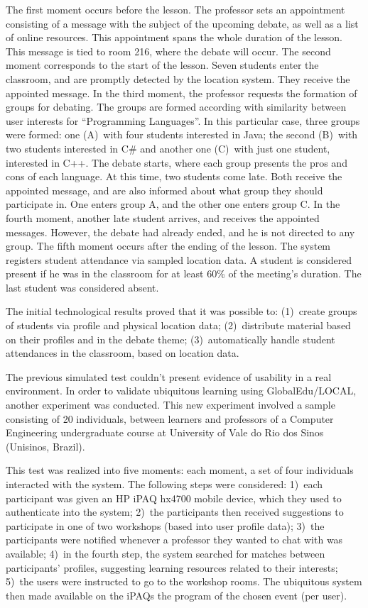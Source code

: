 \documentclass[5p,authoryear]{elsarticle}
\begin{document}
The first moment occurs before the lesson. The professor sets an appointment
consisting of a message with the subject of the upcoming debate, as well as a
list of online resources. This appointment spans the whole duration of the
lesson. This message is tied to room 216, where the debate will occur. The
second moment corresponds to the start of the lesson. Seven students enter the
classroom, and are promptly detected by the location system. They receive the
appointed message. In the third moment, the professor requests the formation of
groups for debating. The groups are formed according with similarity between
user interests for ``Programming Languages''. In this particular case, three
groups were formed: one (A)~with four students interested in Java; the second
(B)~with two students interested in C\# and another one (C)~with just one
student, interested in C++. The debate starts, where each group presents the
pros and cons of each language. At this time, two students come late. Both
receive the appointed message, and are also informed about what group they
should participate in. One enters group A, and the other one enters group C. In
the fourth moment, another late student arrives, and receives the appointed
messages. However, the debate had already ended, and he is not directed to any
group. The fifth moment occurs after the ending of the lesson. The system
registers student attendance via sampled location data. A student is considered
present if he was in the classroom for at least 60\% of the meeting's duration.
The last student was considered absent.

The initial technological results proved that it was possible to: (1)~create
groups of students via profile and physical location data; (2)~distribute
material based on their profiles and in the debate theme; (3)~automatically
handle student attendances in the classroom, based on location data.

The previous simulated test couldn't present evidence of usability in a real
environment. In order to validate ubiquitous learning using GlobalEdu/LOCAL,
another experiment was conducted. This new experiment involved a sample
consisting of 20 individuals, between learners and professors of a Computer
Engineering undergraduate course at University of Vale do Rio dos Sinos
(Unisinos, Brazil).

This test was realized into five moments: each moment, a set of four
individuals interacted with the system. The following steps were considered:
1)~each participant was given an HP iPAQ hx4700 mobile device, which they used
to authenticate into the system; 2)~the participants then received suggestions
to participate in one of two workshops (based into user profile data); 3)~the
participants were notified whenever a professor they wanted to chat with was
available; 4)~in the fourth step, the system searched for matches between
participants' profiles, suggesting learning resources related to their
interests; 5)~the users were instructed to go to the workshop rooms. The
ubiquitous system then made available on the iPAQs the program of the chosen
event (per user). 
\end{document}
